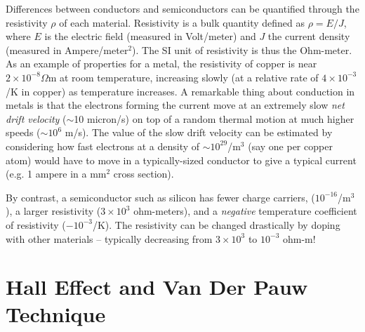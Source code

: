 \documentclass{../lab}
\begin{document}
Differences between conductors and semiconductors can be quantified through the resistivity $\rho$ of each material. Resistivity is a bulk quantity defined as $\rho = E/J$, where $E$ is the electric field (measured in Volt/meter) and $J$ the current density (measured in Ampere/meter$^2$). The SI unit of resistivity is thus the Ohm-meter. As an example of properties for a metal, the resistivity of copper is near $2 \times 10^{-8} \Omega$m at room temperature, increasing slowly (at a relative rate of $4 \times 10^{-3}$/K in copper) as temperature increases. A remarkable thing about conduction in metals is that the electrons forming the current move at an extremely slow \emph{net drift velocity} ($\sim$10 micron/s) on top of a random thermal motion at much higher speeds ($\sim 10^6$ m/s). The value of the slow drift velocity can be estimated by considering how fast electrons at a density of $\sim 10^{29}$/m$^3$ (say one per copper atom) would have to move in a typically-sized conductor to give a typical current (e.g. 1 ampere in a mm$^{2}$ cross section).

By contrast, a semiconductor such as silicon has fewer charge carriers, ($10^{-16}$/m$^3$), a larger resistivity ($3 \times 10^3$ ohm-meters), and a \emph{negative} temperature coefficient of resistivity ($-10^{-3}$/K). The resistivity can be changed drastically by doping with other materials – typically decreasing from $3 \times 10^3$ to $10^{-3}$ ohm-m!

\section{Hall Effect and Van Der Pauw Technique}
\end{document}
